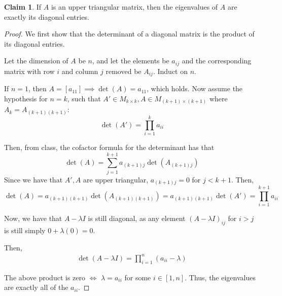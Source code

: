 \documentclass[12pt,letterpaper]{article}
\theoremstyle{definition}
\newtheorem*{claim}{Claim}
\begin{document}
\begin{claim}
  If $A$ is an upper triangular matrix, then the eigenvalues of $A$ are exactly
  its diagonal entries.
\end{claim}

\begin{proof}
  We first show that the determinant of a diagonal matrix is the product of its
  diagonal entries.

  Let the dimension of $A$ be $n$, and let the elements be $a_{ij}$ and the
  corresponding matrix with row $i$ and column $j$ removed be $A_{ij}$. Induct on $n$.

  If $n = 1$, then $A = [a_{11}] \implies \det(A) = a_{11}$, which holds. Now
  assume the hypothesis for $n = k$, such that $A' \in M_{ k\times k}, A
  \in M_{(k+1) \times (k+1)}$ where $A_k = A_{(k+1)(k+1)}$:
  \[
    \det(A') = \prod_{i=1}^ka_{ii}
  \]

  Then, from class, the cofactor formula for the determinant has that
  \[
    \det(A) = \sum_{j=1}^{k+1}a_{(k+1)j}\det(A_{(k+1)j})
  \]
  Since we have that $A', A$ are upper triangular, $a_{(k+1)j} = 0$ for
  $j < k + 1$. Then,
  \[
    \det(A) = a_{(k+1)(k+1)}\det(A_{(k+1)(k+1)}) = a_{(k+1)(k+1)}\det(A')
    = \prod_{i=1}^{k+1}a_{ii}
  \]

  Now, we have that $A - \lambda I$ is still diagonal, as any element $(A -
  \lambda I)_{ij}$ for $i > j$ is still simply $0 + \lambda (0) = 0$.

  Then,
  \begin{align*}
    \det(A - \lambda I) = \prod_{i=1}^n(a_{ii} - \lambda)
  \end{align*}

  The above product is zero $\iff$ $\lambda = a_{ii}$ for some $i \in [1, n]$.
  Thus, the eigenvalues are exactly all of the $a_{ii}$.
\end{proof}
\end{document}
